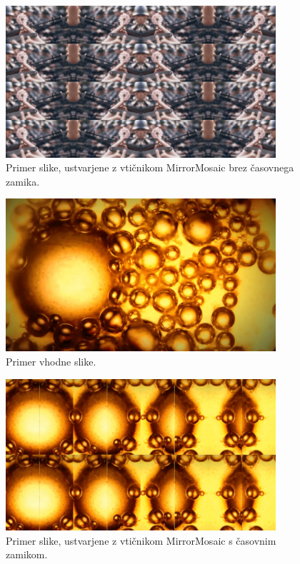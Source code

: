 \documentclass[a4paper, 12pt]{book}
\begin{document}
\begin{figure}[h!]
\begin{center}
\includegraphics[width=10cm]{img/naziflowerMIRRORMOSAIC.PNG}
\end{center}
\caption{Primer slike, ustvarjene z vtičnikom MirrorMosaic brez časovnega zamika.}
\label{demo3}
\end{figure}

\newpage

\begin{figure}[h]
\begin{center}
\includegraphics[width=10cm]{img/microbubble.PNG}
\end{center}
\caption{Primer vhodne slike.}
\label{orig4}
\end{figure}

\begin{figure}[h!]
\begin{center}
\includegraphics[width=10cm]{img/microbubbleMIRRORMOSAIC.PNG}
\end{center}
\caption{Primer slike, ustvarjene z vtičnikom MirrorMosaic s časovnim zamikom.}
\label{demo4}
\end{figure}
\end{document}

